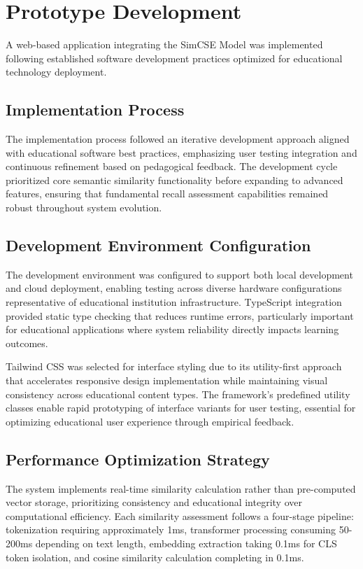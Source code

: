 {\section{Prototype Development}
\label{sec:prototype_development}

A web-based application integrating the SimCSE Model was implemented following established software development practices optimized for educational technology deployment.

\subsection{Implementation Process}

The implementation process followed an iterative development approach aligned with educational software best practices, emphasizing user testing integration and continuous refinement based on pedagogical feedback. The development cycle prioritized core semantic similarity functionality before expanding to advanced features, ensuring that fundamental recall assessment capabilities remained robust throughout system evolution.

\subsection{Development Environment Configuration}

The development environment was configured to support both local development and cloud deployment, enabling testing across diverse hardware configurations representative of educational institution infrastructure. TypeScript integration provided static type checking that reduces runtime errors, particularly important for educational applications where system reliability directly impacts learning outcomes.

Tailwind CSS was selected for interface styling due to its utility-first approach that accelerates responsive design implementation while maintaining visual consistency across educational content types. The framework's predefined utility classes enable rapid prototyping of interface variants for user testing, essential for optimizing educational user experience through empirical feedback.

\subsection{Performance Optimization Strategy}

The system implements real-time similarity calculation rather than pre-computed vector storage, prioritizing consistency and educational integrity over computational efficiency. Each similarity assessment follows a four-stage pipeline: tokenization requiring approximately 1ms, transformer processing consuming 50-200ms depending on text length, embedding extraction taking 0.1ms for CLS token isolation, and cosine similarity calculation completing in 0.1ms.

}
